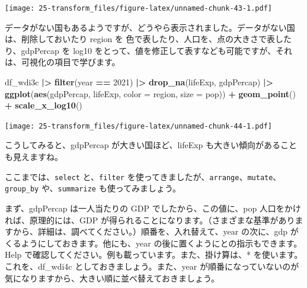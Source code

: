 \documentclass[
  xelatex, ja=standard]{bxjsbook}
\newenvironment{Shaded}{\begin{snugshade}}{\end{snugshade}}
\newcommand{\AttributeTok}[1]{\textcolor[rgb]{0.13,0.29,0.53}{#1}}
\newcommand{\DecValTok}[1]{\textcolor[rgb]{0.00,0.00,0.81}{#1}}
\newcommand{\FunctionTok}[1]{\textcolor[rgb]{0.13,0.29,0.53}{\textbf{#1}}}
\newcommand{\NormalTok}[1]{#1}
\newcommand{\SpecialCharTok}[1]{\textcolor[rgb]{0.81,0.36,0.00}{\textbf{#1}}}
\theoremstyle{definition}
\theoremstyle{definition}
\theoremstyle{definition}
\theoremstyle{definition}
\theoremstyle{remark}
\begin{document}
\texttt{[image: 25-transform\_files/figure-latex/unnamed-chunk-43-1.pdf]}

データがない国もあるようですが、どうやら表示されました。データがない国は、削除しておいたり region を 色で表したり、人口を、点の大きさで表したり、gdpPercap を log10 をとって、値を修正して表すなども可能ですが、それは、可視化の項目で学びます。

\begin{Shaded}
\begin{Highlighting}[]
\NormalTok{df\_wdi3c }\SpecialCharTok{|\textgreater{}} \FunctionTok{filter}\NormalTok{(year }\SpecialCharTok{==} \DecValTok{2021}\NormalTok{) }\SpecialCharTok{|\textgreater{}} \FunctionTok{drop\_na}\NormalTok{(lifeExp, gdpPercap) }\SpecialCharTok{|\textgreater{}}
  \FunctionTok{ggplot}\NormalTok{(}\FunctionTok{aes}\NormalTok{(gdpPercap, lifeExp, }\AttributeTok{color =}\NormalTok{ region, }\AttributeTok{size =}\NormalTok{ pop)) }\SpecialCharTok{+} 
  \FunctionTok{geom\_point}\NormalTok{() }\SpecialCharTok{+} \FunctionTok{scale\_x\_log10}\NormalTok{()}
\end{Highlighting}
\end{Shaded}

\texttt{[image: 25-transform\_files/figure-latex/unnamed-chunk-44-1.pdf]}

こうしてみると、gdpPercap が大きい国ほど、lifeExp も大きい傾向があることも見えますね。

ここまでは、\texttt{select} と、\texttt{filter} を使ってきましたが、\texttt{arrange}、\texttt{mutate}、\texttt{group\_by} や、\texttt{summarize} も使ってみましょう。

まず、gdpPercap は一人当たりの GDP でしたから、この値に、pop 人口をかければ、原理的には、GDP が得られることになります。（さまざまな基準がありますから、詳細は、調べてください。）順番を、入れ替えて、year の次に、gdp がくるようにしておきます。他にも、year の後に置くようにとの指示もできます。Help で確認してください。例も載っています。また、掛け算は、* を使います。これを、df\_wdi4c としておきましょう。また、year が順番になっていないのが気になりますから、大きい順に並べ替えておきましょう。
\end{document}
